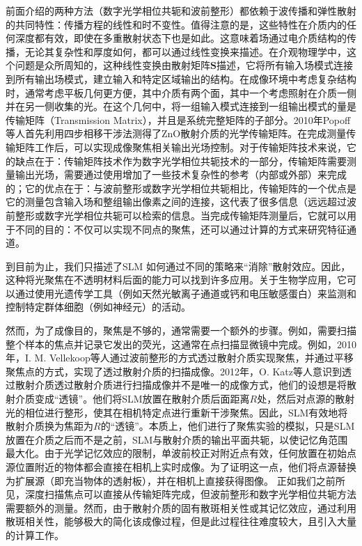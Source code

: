 前面介绍的两种方法（数字光学相位共轭和波前整形）都依赖于波传播和弹性散射的共同特性：传播方程的线性和时不变性。值得注意的是，这些特性在介质内的任何深度都有效，即使在多重散射状态下也是如此。这意味着场通过电介质结构的传播，无论其复杂性和厚度如何，都可以通过线性变换来描述。在介观物理学中，这个问题是众所周知的，这种线性变换由散射矩阵$\mathbf{S}$描述，它将所有输入场模式连接到所有输出场模式，建立输入和特定区域输出的结构。在成像环境中考虑复杂结构时，通常考虑平板几何更方便，其中介质有两个面，其中一个考虑照射在介质一侧并在另一侧收集的光。在这个几何中，将一组输入模式连接到一组输出模式的量是传输矩阵（Transmission Matrix），并且是系统完整矩阵的子部分。2010年Popoff等人\cite{Popoff2010}首先利用四步相移干涉法测得了ZnO散射介质的光学传输矩阵。在完成测量传输矩阵工作后，可以实现成像聚焦相关输出光场控制。对于传输矩阵技术来说，它的缺点在于：传输矩阵技术作为数字光学相位共轭技术的一部分，传输矩阵需要测量输出光场，需要通过使用增加了一些技术复杂性的参考（内部或外部）来完成的；它的优点在于：与波前整形或数字光学相位共轭相比，传输矩阵的一个优点是它的测量包含输入场和整组输出像素之间的连接，这代表了很多信息（远远超过波前整形或数字光学相位共轭可以检索的信息。当完成传输矩阵测量后，它就可以用于不同的目的：不仅可以实现不同点的聚焦，还可以通过计算的方式来研究特征通道。

到目前为止，我们只描述了SLM 如何通过不同的策略来“消除”散射效应。因此，这种将光聚焦在不透明材料后面的能力可以找到许多应用。关于生物学应用，它可以通过使用光遗传学工具（例如天然光敏离子通道或钙和电压敏感蛋白）来监测和控制特定群体细胞（例如神经元）的活动。

然而，为了成像目的，聚焦是不够的，通常需要一个额外的步骤。例如，需要扫描整个样本的焦点并记录它发出的荧光，这通常在点扫描显微镜中完成。例如，2010年，I. M. Vellekoop等人\cite{vellekoop_scattered_2010}通过波前整形的方式透过散射介质实现聚焦，并通过平移聚焦点的方式，实现了透过散射介质的扫描成像。2012年，O. Katz等人\cite{katz_looking_2012}意识到透过散射介质透过散射介质进行扫描成像并不是唯一的成像方式，他们的设想是将散射介质变成“透镜”。他们将SLM放置在散射介质后面距离$R$处，然后对点源的散射光的相位进行整形，使其在相机特定点进行重新干涉聚焦。因此，SLM有效地将散射介质换为焦距为$R$的“透镜”。本质上，他们进行了聚焦实验的模拟，只是SLM放置在介质之后而不是之前，SLM与散射介质的输出平面共轭，以使记忆角范围最大化。由于光学记忆效应的限制，单波前校正对附近点有效，任何放置在初始点源位置附近的物体都会直接在相机上实时成像。为了证明这一点，他们将点源替换为扩展源（即充当物体的透射板），并在相机上直接获得图像。
正如我们之前所见，深度扫描焦点可以直接从传输矩阵完成，但波前整形和数字光学相位共轭方法需要额外的测量。然而，由于散射介质的固有散斑相关性或其记忆效应，通过利用散斑相关性，能够极大的简化该成像过程，但是此过程往往难度较大，且引入大量的计算工作。

